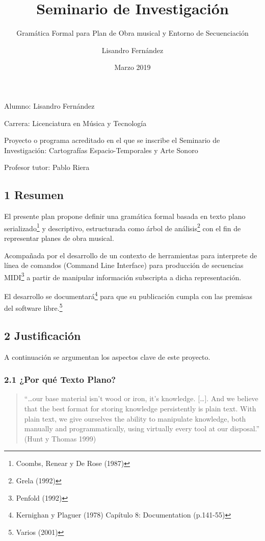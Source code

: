 \documentclass[]{article}
\title{Seminario de Investigación}
\subtitle{Gramática Formal para Plan de Obra musical y Entorno de Secuenciación}
\author{Lisandro Fernández}
\date{Marzo 2019}
\begin{document}

Alumno: Lisandro Fernández


Carrera:
Licenciatura en Música y Tecnología


Proyecto o programa acreditado en el que se inscribe el Seminario de Investigación: 
Cartografías Espacio-Temporales y Arte Sonoro



Profesor tutor: Pablo Riera



{
\setcounter{tocdepth}{3}

\renewcommand{\contentsname}{Contendios}
\tableofcontents
}
\hypertarget{resumen}{%
\subsection{1 Resumen}\label{resumen}}

El presente plan propone definir una gramática formal basada en texto
plano serializado\footnote{Coombs, Renear y De Rose (1987)} y
descriptivo, estructurada como árbol de análisis\footnote{Grela (1992)}
con el fin de representar planes de obra musical.

Acompañada por el desarrollo de un contexto de herramientas para
interprete de línea de comandos (Command Line Interface) para producción
de secuencias MIDI\footnote{Penfold (1992)} a partir de manipular
información subscripta a dicha representación.

El desarrollo se documentará\footnote{Kernighan y Plaguer (1978)
  Capítulo 8: Documentation (p.141-55)} para que su publicación cumpla
con las premisas del software libre.\footnote{Varios (2001)}

\newpage

\hypertarget{justificaciuxf3n}{%
\subsection{2 Justificación}\label{justificaciuxf3n}}

A continuación se argumentan los aspectos clave de este proyecto.

\hypertarget{por-quuxe9-texto-plano}{%
\subsubsection{2.1 ¿Por qué Texto Plano?}\label{por-quuxe9-texto-plano}}

\begin{quote}
``\ldots our base material isn't wood or iron, it's knowledge.
{[}\ldots{]}. And we believe that the best format for storing knowledge
persistently is plain text. With plain text, we give ourselves the
ability to manipulate knowledge, both manually and programmatically,
using virtually every tool at our disposal.'' (Hunt y Thomas 1999)
\end{quote}
\end{document}
